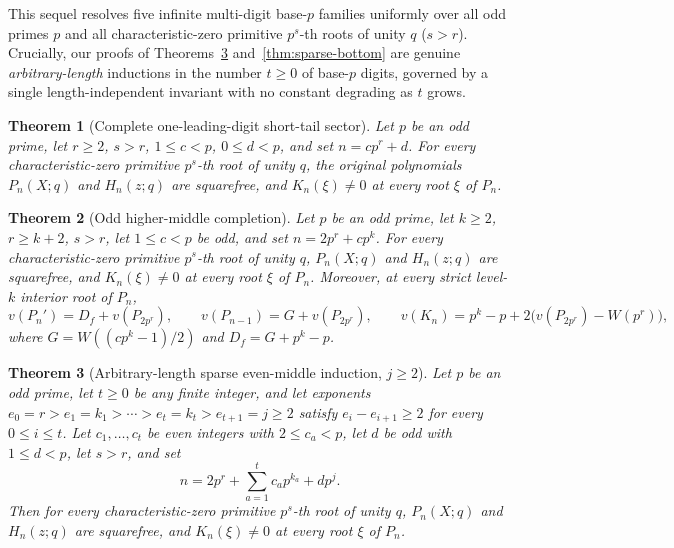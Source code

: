 \documentclass[11pt,reqno]{amsart}
\numberwithin{equation}{section}
\newtheorem{theorem}{Theorem}[section]
\theoremstyle{definition}
\theoremstyle{remark}
\begin{document}
This sequel resolves five infinite multi-digit base-$p$ families uniformly over all odd primes $p$ and all characteristic-zero primitive $p^s$-th roots of unity $q$ ($s>r$). Crucially, our proofs of Theorems~\ref{thm:sparse-j2} and~\ref{thm:sparse-bottom} are genuine \emph{arbitrary-length} inductions in the number $t\ge 0$ of base-$p$ digits, governed by a single length-independent invariant with no constant degrading as $t$ grows.

\begin{theorem}[Complete one-leading-digit short-tail sector]
\label{thm:short-tail}
Let $p$ be an odd prime, let $r\ge 2$, $s>r$, $1\le c<p$, $0\le d<p$, and set $n=cp^r+d$. For every characteristic-zero primitive $p^s$-th root of unity $q$, the original polynomials $P_n(X;q)$ and $H_n(z;q)$ are squarefree, and $K_n(\xi)\ne 0$ at every root $\xi$ of $P_n$.
\end{theorem}

\begin{theorem}[Odd higher-middle completion]
\label{thm:odd-middle}
Let $p$ be an odd prime, let $k\ge 2$, $r\ge k+2$, $s>r$, let $1\le c<p$ be odd, and set $n = 2p^r + cp^k$. For every characteristic-zero primitive $p^s$-th root of unity $q$, $P_n(X;q)$ and $H_n(z;q)$ are squarefree, and $K_n(\xi)\ne 0$ at every root $\xi$ of $P_n$. Moreover, at every strict level-$k$ interior root of $P_n$,
\[
v(P_n') = D_f + v(P_{2p^r}),\qquad
v(P_{n-1}) = G + v(P_{2p^r}),\qquad
v(K_n) = p^k - p + 2\bigl(v(P_{2p^r}) - W(p^r)\bigr),
\]
where $G=W((cp^k-1)/2)$ and $D_f=G+p^k-p$.
\end{theorem}

\begin{theorem}[Arbitrary-length sparse even-middle induction, $j\ge 2$]
\label{thm:sparse-j2}
Let $p$ be an odd prime, let $t\ge 0$ be any finite integer, and let exponents $e_0=r > e_1=k_1 > \cdots > e_t=k_t > e_{t+1}=j \ge 2$ satisfy $e_i - e_{i+1}\ge 2$ for every $0\le i\le t$. Let $c_1,\ldots,c_t$ be even integers with $2\le c_a<p$, let $d$ be odd with $1\le d<p$, let $s>r$, and set
\begin{equation}
\label{eq:n-sparse-j2}
n = 2p^r + \sum_{a=1}^t c_a p^{k_a} + d p^j.
\end{equation}
Then for every characteristic-zero primitive $p^s$-th root of unity $q$, $P_n(X;q)$ and $H_n(z;q)$ are squarefree, and $K_n(\xi)\ne 0$ at every root $\xi$ of $P_n$.
\end{theorem}
\end{document}
